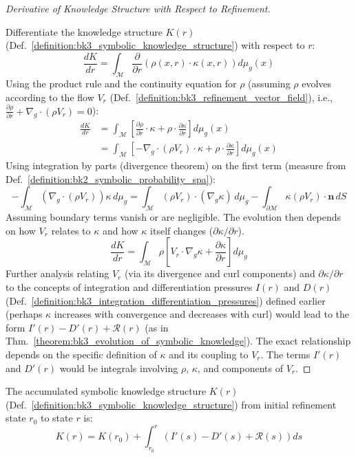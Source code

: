 \begin{proof}[Derivative of Knowledge Structure with Respect to Refinement]
\label{proof:bk3_differentiation_knowledge_structure}
\leavevmode

Differentiate the knowledge structure $K(r)$
(Def.~\ref{definition:bk3_symbolic_knowledge_structure}) with respect to $r$:
\[
\frac{dK}{dr} = \int_{\mathcal{M}} \frac{\partial}{\partial r}(\rho(x,r) \cdot \kappa(x,r)) d\mu_g(x)
\]
Using the product rule and the continuity equation for $\rho$ (assuming $\rho$ evolves according to the flow $V_r$ (Def.~\ref{definition:bk3_refinement_vector_field}), i.e., $\frac{\partial \rho}{\partial r} + \nabla_g \cdot (\rho V_r) = 0$):
\begin{align*}
\frac{dK}{dr} &= \int_{\mathcal{M}} \left[ \frac{\partial \rho}{\partial r} \cdot \kappa + \rho \cdot \frac{\partial \kappa}{\partial r} \right] d\mu_g(x) \\
&= \int_{\mathcal{M}} \left[ -\nabla_g \cdot (\rho V_r) \cdot \kappa + \rho \cdot \frac{\partial \kappa}{\partial r} \right] d\mu_g(x)
\end{align*}
Using integration by parts (divergence theorem) on the first term (measure from Def.~\ref{definition:bk2_symbolic_probability_spa}):
\[
-\int_{\mathcal{M}} (\nabla_g \cdot (\rho V_r)) \kappa \, d\mu_g = \int_{\mathcal{M}} (\rho V_r) \cdot (\nabla_g \kappa) \, d\mu_g - \int_{\partial\mathcal{M}} \kappa (\rho V_r) \cdot \mathbf{n} \, dS
\]
Assuming boundary terms vanish or are negligible. The evolution then depends on how $V_r$ relates to $\kappa$ and how $\kappa$ itself changes ($\partial \kappa / \partial r$).
\[
\frac{dK}{dr} = \int_{\mathcal{M}} \rho \left[ V_r \cdot \nabla_g \kappa + \frac{\partial \kappa}{\partial r} \right] d\mu_g
\]
Further analysis relating $V_r$ (via its divergence and curl components) and $\partial \kappa / \partial r$ to the concepts of integration and differentiation pressures $I(r)$ and $D(r)$ (Def.~\ref{definition:bk3_integration_differentiation_pressures}) defined earlier (perhaps $\kappa$ increases with convergence and decreases with curl) would lead to the form $I'(r) - D'(r) + \mathcal{R}(r)$ (as in Thm.~\ref{theorem:bk3_evolution_of_symbolic_knowledge}). The exact relationship depends on the specific definition of $\kappa$ and its coupling to $V_r$. The terms $I'(r)$ and $D'(r)$ would be integrals involving $\rho$, $\kappa$, and components of $V_r$.
\end{proof}

\begin{corollary} \label{corollary:bk3_integrated_knowledge_structure}
The accumulated symbolic knowledge structure $K(r)$ (Def.~\ref{definition:bk3_symbolic_knowledge_structure}) from initial refinement state $r_0$ to state $r$ is:
\[
K(r) = K(r_0) + \int_{r_0}^r (I'(s) - D'(s) + \mathcal{R}(s)) ds
\]
\end{corollary}

